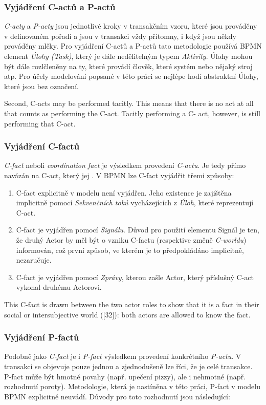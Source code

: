 \documentclass[]{article}
\begin{document}
\subsubsection{Vyjádření C-actů a P-actů}
\textit{C-acty} a \textit{P-acty} jsou jednotlivé kroky v transakčním vzoru, které jsou prováděny v definovaném pořadí a jsou v transakci vždy přítomny, i když jsou někdy prováděny mlčky. Pro vyjádření C-actů a P-actů tato metodologie používá BPMN element \textit{Úlohy (Task)}, který je dále nedělitelným typem \textit{Aktivity}. Úlohy mohou být dále rozlčleněny na ty, které provádí člověk, které systém nebo nějaký stroj atp. Pro účely modelování popsané v této práci se nejlépe hodí abstraktní Úlohy, které jsou bez označení. 

Second, C-acts may be performed tacitly. This means that there is no act at all that counts as performing the C-act. Tacitly performing a C- act, however, is still performing that C-act.

\subsubsection{Vyjádření C-factů}
\textit{C-fact} neboli \textit{coordination fact} je výsledkem provedení \textit{C-actu}. Je tedy přímo navázán na C-act, který jej . V BPMN lze C-fact vyjádřit třemi způsoby:

\begin{enumerate}
\item C-fact explicitně v modelu není vyjádřen. Jeho existence je zajištěna implicitně pomocí \textit{Sekvenčních toků} vycházejících z \textit{Úloh}, které reprezentují C-act.
\item C-fact je vyjádřen pomocí \textit{Signálu}. Důvod pro použití elementu Signál je ten, že druhý Actor by měl být o vzniku C-factu (respektive změně \textit{C-worldu}) informován, což první způsob, ve kterém je to předpokládáno implicitně, nezaručuje.
\item C-fact je vyjádřen pomocí \textit{Zprávy}, kterou zašle Actor, který příslušný C-act vykonal druhému Actorovi.
\end{enumerate}

This C-fact is drawn between the two actor roles to show that it is a fact in their social or intersubjective world ([32]): both actors are allowed to know the fact. 

\subsubsection{Vyjádření P-factů}
Podobně jako \textit{C-fact} je i \textit{P-fact} výsledkem provedení konkrétního \textit{P-actu}. V transakci se objevuje pouze jednou a zjednodušeně lze říci, že je  celé transakce. P-fact může být hmotné povahy (např. upečení pizzy), ale i nehmotné (např. rozhodnutí poroty). Metodologie, která je nastíněna v této práci, P-fact v modelu BPMN explicitně neuvádí. Důvody pro toto rozhodnutí jsou následující:
\end{document}

